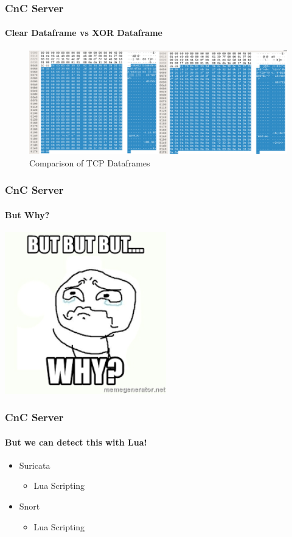 \documentclass[aspectratio=169]{beamer}
\begin{document}
\begin{frame}
  \frametitle{CnC Server}
  \framesubtitle{Clear Dataframe vs XOR Dataframe}
  \begin{center}
    \begin{figure}
      \includegraphics[width=14cm,keepaspectratio]{tcp_xor_dataframe}
      \caption{Comparison of TCP Dataframes}
    \end{figure}
  \end{center}
\end{frame}

\begin{frame}
  \frametitle{CnC Server}
  \framesubtitle{But Why?}
  \begin{center}
    \includegraphics[width=7cm,keepaspectratio]{but_why}
  \end{center}
\end{frame}

\begin{frame}
  \frametitle{CnC Server}
  \framesubtitle{But we can detect this with Lua!}
  \begin{itemize}
  \item{Suricata}
    \begin{itemize}
    \item{Lua Scripting}
    \end{itemize}
  \item{Snort}
    \begin{itemize}
    \item{Lua Scripting}
    \end{itemize}
  \end{itemize}
\end{frame}
\end{document}
